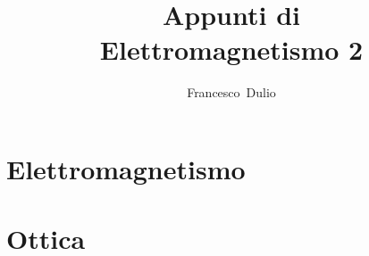 \documentclass[a4paper,11pt,twoside,openany]{report}
\author{Francesco~Dulio}
\title{Appunti di \\Elettromagnetismo 2}
\date{}
\theoremstyle{definition}
\theoremstyle{plain}
\begin{document}
\maketitle
\tableofcontents

\part{Elettromagnetismo}
\part{Ottica}
\end{document}
